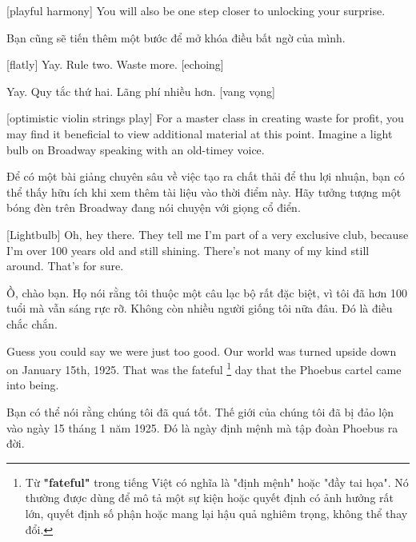 \documentclass[a4paper]{article}
\begin{document}
	[playful harmony]
	You will also be one step closer to unlocking your surprise.
	
	\begin{vietnamese-v2}
		Bạn cũng sẽ tiến thêm một bước để mở khóa điều bất ngờ của mình.
	\end{vietnamese-v2}
	
	
	[flatly] Yay.
	Rule two.
	Waste more. [echoing]
	
	\begin{vietnamese-v2}
		 Yay. 
		Quy tắc thứ hai. 
		Lãng phí nhiều hơn. [vang vọng]
	\end{vietnamese-v2}
	
	[optimistic violin strings play]
	For a master class in creating waste for profit, you may find it beneficial to view additional material at this point.
	Imagine a light bulb on Broadway speaking with an old-timey voice.
	
	\begin{vietnamese-v2}
		Để có một bài giảng chuyên sâu về việc tạo ra chất thải để thu lợi nhuận, bạn có thể thấy hữu ích khi xem thêm tài liệu vào thời điểm này. 
		Hãy tưởng tượng một bóng đèn trên Broadway đang nói chuyện với giọng cổ điển.
	\end{vietnamese-v2}
	
	[Lightbulb] Oh, hey there.
	They tell me I'm part of a very exclusive club, because I'm over 100 years old and still shining.
	There's not many of my kind still around. That's for sure.
	
	\begin{vietnamese-v2}
		 Ồ, chào bạn. 
		Họ nói rằng tôi thuộc một câu lạc bộ rất đặc biệt, vì tôi đã hơn 100 tuổi mà vẫn sáng rực rỡ. 
		Không còn nhiều người giống tôi nữa đâu. Đó là điều chắc chắn.
	\end{vietnamese-v2}
	
	Guess you could say we were just too good.
	Our world was turned upside down on January 15th, 1925.
	That was the fateful \footnote{
		Từ \textbf{"fateful"} trong tiếng Việt có nghĩa là "định mệnh" hoặc "đầy tai họa". Nó thường được dùng để mô tả một sự kiện hoặc quyết định có ảnh hưởng rất lớn, quyết định số phận hoặc mang lại hậu quả nghiêm trọng, không thể thay đổi.
	} day that the Phoebus cartel came into being.
	
	\begin{vietnamese-v2}
		Bạn có thể nói rằng chúng tôi đã quá tốt. 
		Thế giới của chúng tôi đã bị đảo lộn vào ngày 15 tháng 1 năm 1925. 
		Đó là ngày định mệnh mà tập đoàn Phoebus ra đời.
	\end{vietnamese-v2}
	
\end{document}

